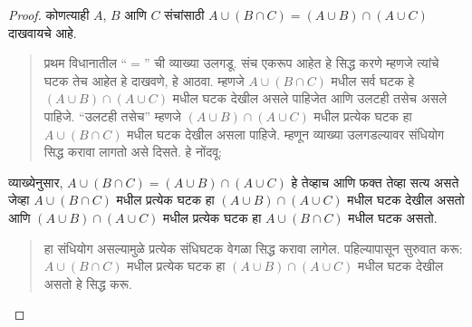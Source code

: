 \begin{proof}
कोणत्याही $A$, $B$ आणि $C$ संचांसाठी $A \cup (B \cap C) = (A \cup B) \cap (A \cup C)$ दाखवायचे आहे.
\begin{quote}
प्रथम विधानातील “$=$” ची व्याख्या उलगडू. संच एकरूप आहेत हे सिद्ध करणे म्हणजे त्यांचे घटक तेच आहेत हे दाखवणे, हे आठवा. म्हणजे $A \cup (B \cap C)$ मधील सर्व घटक हे $(A \cup B) \cap (A \cup C)$ मधील घटक देखील असले पाहिजेत आणि उलटही तसेच असले पाहिजे. “उलटही तसेच” म्हणजे $(A \cup B) \cap (A \cup C)$ मधील प्रत्येक घटक हा $A \cup (B \cap C)$ मधील घटक देखील असला पाहिजे. म्हणून व्याख्या उलगडल्यावर संधियोग सिद्ध करावा लागतो असे दिसते. हे नोंदवू:
\end{quote}
व्याख्येनुसार, $A \cup (B \cap C) = (A \cup B) \cap (A \cup C)$ हे तेव्हाच आणि फक्त तेव्हा सत्य असते जेव्हा $A \cup (B \cap C)$ मधील प्रत्येक घटक हा $(A \cup B) \cap (A \cup C)$ मधील घटक देखील असतो आणि $(A \cup B) \cap (A \cup C)$ मधील प्रत्येक घटक हा $A \cup (B \cap C)$ मधील घटक असतो.
\begin{quote}
हा संधियोग असल्यामुळे प्रत्येक संधिघटक वेगळा सिद्ध करावा लागेल. पहिल्यापासून सुरुवात करू: $A \cup (B \cap C)$ मधील प्रत्येक घटक हा $(A \cup B) \cap (A \cup C)$ मधील घटक देखील असतो हे सिद्ध करू.


\end{quote}
\end{proof}
